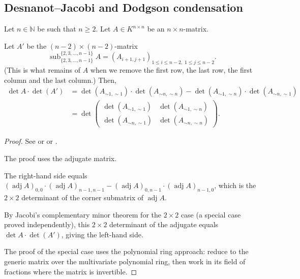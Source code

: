 \subsection{Desnanot--Jacobi and Dodgson condensation}

\begin{theorem}
\label{thm.det.des-jac-1}
\leantarget
\leanok
Let $n \in \mathbb{N}$ be such that $n \geq 2$. Let $A \in K^{n \times n}$ be
an $n \times n$-matrix.

Let $A'$ be the $(n-2) \times (n-2)$-matrix
\[
  \operatorname{sub}_{\{2, 3, \ldots, n-1\}}^{\{2, 3, \ldots, n-1\}} A
  = \left( A_{i+1, j+1} \right)_{1 \leq i \leq n-2,\; 1 \leq j \leq n-2}.
\]
(This is what remains of $A$ when we remove the first row, the last row, the
first column and the last column.) Then,
\begin{align*}
  \det A \cdot \det(A')
  &= \det(A_{\sim 1, \sim 1}) \cdot \det(A_{\sim n, \sim n})
     - \det(A_{\sim 1, \sim n}) \cdot \det(A_{\sim n, \sim 1}) \\
  &= \det \begin{pmatrix}
       \det(A_{\sim 1, \sim 1}) & \det(A_{\sim 1, \sim n}) \\
       \det(A_{\sim n, \sim 1}) & \det(A_{\sim n, \sim n})
     \end{pmatrix}.
\end{align*}
\end{theorem}

\begin{proof}
See \cite[Proposition 6.122]{detnotes} or \cite[\S 3.5, proof of Theorem 3.12]{Bresso99} or
\cite{zeilberger-twotime}.

The proof uses the adjugate matrix.

The right-hand side equals
$(\operatorname{adj} A)_{0,0} \cdot (\operatorname{adj} A)_{n-1,n-1}
- (\operatorname{adj} A)_{0,n-1} \cdot (\operatorname{adj} A)_{n-1,0}$,
which is the $2 \times 2$ determinant of the corner submatrix of
$\operatorname{adj} A$.

By Jacobi's complementary minor theorem for the $2 \times 2$ case (a special
case proved independently), this $2 \times 2$ determinant of the adjugate
equals $\det A \cdot \det(A')$, giving the left-hand side.

The proof of the special case uses the
polynomial ring approach: reduce to the generic matrix over
the multivariate polynomial ring, then work in its field of fractions where the matrix
is invertible.
\end{proof}

